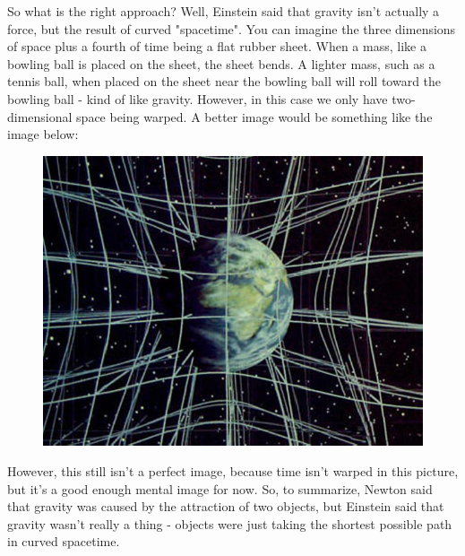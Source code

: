 So what is the right approach? Well, Einstein said that gravity isn't actually a force, but the result of curved "spacetime". You can 
imagine the three dimensions of space plus a fourth of time being a flat rubber sheet. When a mass, like a bowling ball is placed
on the sheet, the sheet bends. A lighter mass, such as a tennis ball, when placed on the sheet near the bowling ball will roll toward
the bowling ball - kind of like gravity. However, in this case we only have two-dimensional space being warped. A better image
would be something like the image below:
\begin{figure}[H]
\includegraphics[scale=0.5]{warpspace.jpg}
\end{figure}
However, this still isn't a perfect image, because time isn't warped in this picture, but it's a good enough mental image for now.
So, to summarize, Newton said that gravity was caused by the attraction of two objects, but Einstein said that gravity wasn't
really a thing - objects were just taking the shortest possible path in curved spacetime. 

